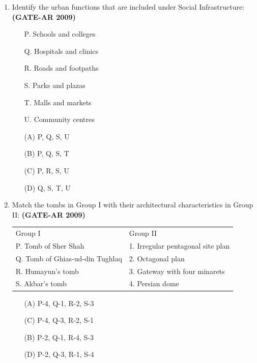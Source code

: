 \documentclass[a4paper,10pt]{article}
\begin{document}
\begin{enumerate}
    \item Identify the urban functions that are included under Social Infrastructure: \hfill \textbf{(GATE-AR 2009)}
    \begin{itemize}
        \item[P.] Schools and colleges
        \item[Q.] Hospitals and clinics
        \item[R.] Roads and footpaths
        \item[S.] Parks and plazas
        \item[T.] Malls and markets
        \item[U.] Community centres
    \end{itemize}
    \begin{multicols}{4}
	\begin{itemize}
        \item[(A)] P, Q, S, U
        \item[(B)] P, Q, S, T
        \item[(C)] P, R, S, U
        \item[(D)] Q, S, T, U
    \end{itemize}
	\end{multicols}

    \item Match the tombs in Group I with their architectural characteristics in Group II: \hfill \textbf{(GATE-AR 2009)} \\
    \begin{tabular}{ p p }
	Group I & Group II \\
	P. Tomb of Sher Shah & 1. Irregular pentagonal site plan \\
	Q. Tomb of Ghias-ud-din Tughlaq & 2. Octagonal plan \\
	R. Humayun’s tomb & 3. Gateway with four minarets \\
	S. Akbar’s tomb & 4. Persian dome \\
	\end{tabular}
	\begin{multicols}{2}
	\begin{itemize}
        \item[(A)] P-4, Q-1, R-2, S-3
        \item[(C)] P-4, Q-3, R-2, S-1
        \item[(B)] P-2, Q-1, R-4, S-3
        \item[(D)] P-2, Q-3, R-1, S-4
    \end{itemize}
	\end{multicols}


\end{enumerate}
\end{document}
